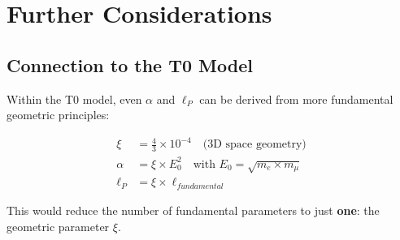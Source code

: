 	\section{Further Considerations}
	
	\subsection{Connection to the T0 Model}
	
	Within the T0 model, even $\alpha$ and $\ell_P$ can be derived from more fundamental geometric principles:
	
	\begin{align}
		\xi &= \frac{4}{3} \times 10^{-4} \quad \text{(3D space geometry)}\\
		\alpha &= \xi \times E_0^2 \quad \text{with } E_0 = \sqrt{m_e \times m_\mu}\\
		\ell_P &= \xi \times \ell_{fundamental}
	\end{align}
	
	This would reduce the number of fundamental parameters to just \textbf{one}: the geometric parameter $\xi$.
	